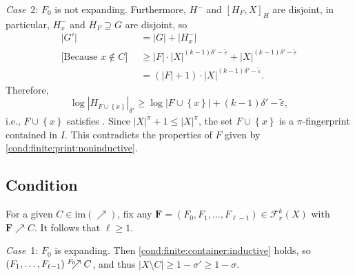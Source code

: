 \documentclass[12pt,reqno]{amsart}
\theoremstyle{plain}
\theoremstyle{definition}
\theoremstyle{remark}
\newenvironment{case}[2]{\smallskip\par\noindent \textit{Case}~#1: \rmfamily #2.}{}
\newcommand{\0}{\mathbb{\emptyset}}
\newcommand{\set}[1]{\left\{ #1 \right\}}
\newcommand{\de}{\delta}
\newcommand{\e}{\varepsilon}
\newcommand{\si}{\sigma}
\newcommand{\FC}{\mathcal{F}}
\newcommand{\im}{\mathrm{im}}
\newcommand{\capsize}[2]{\left|#2\right|_{#1}}
\newcommand{\Prints}[1][k]{\FC_\pi^{#1}(X)}
\newcommand{\Print}{\boldsymbol{F}}
\newcommand{\eqcomment}[2][6pt]{\Big[\text{#2}\Big] \hspace{#1}}
\newcommand{\crel}{\nearrow}
\newcommand{\crelG}[1]{\mathrel{{}^{#1}\mathclap{\nearrow}{\;\:}}}
\begin{document}
\begin{case}{2}{$F_0$ is not expanding}
	Furthermore, $H^-$ and $[H_F, X]_H$ are disjoint, in particular, $H^-_x$ and $H_F \supseteq G$ are disjoint, so
	\begin{align*}
	|G'| &= |G| + |H^-_x| 
	\\
	\eqcomment{Because $x \notin C$}
	&\ge |F| \cdot |X|^{(k-1) \de' - \tilde\e} + |X|^{(k-1) \de' - \tilde\e} 
	\\
	&=
	(|F| + 1) \cdot |X|^{(k-1) \de' - \tilde\e}.
	\end{align*}
	Therefore,
	\[
	\log\capsize{\de'}{H_{F \cup \set{x}}} 
	\ge 
	\log |F \cup \set{x}| + (k-1) \de' - \tilde\e,
	\] 
	i.e., $F \cup \set{x}$ satisfies . Since $|X|^{\tilde{\pi}} + 1 \leq |X|^\pi$, the set $F \cup \set{x}$ is a $\pi$-fingerprint contained in $I$. This contradicts the properties of $F$ given by \cref{cond:finite:print:noninductive}.
\end{case}

\subsection{Condition }

For a given $C \in \im(\crel)$, fix any $\Print = (F_0, F_1, \hdots, F_{\ell-1})  \in \Prints$ with $\Print \crel C$. It follows that $\ell \geq 1$.

\begin{case}{1}{$F_0$ is expanding}
	Then \cref{cond:finite:container:inductive} holds, so $(F_1, \hdots, F_{\ell-1}) \crelG{F_0} C$, and thus $|X \setminus C| \ge 1 - \si' \ge 1 - \si$.
\end{case}
\end{document}

